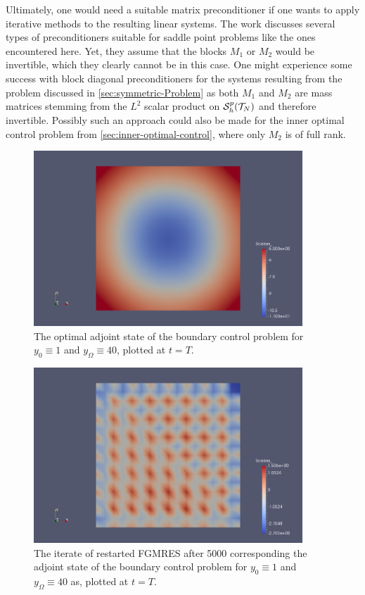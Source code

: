 \documentclass[../thesis.tex]{subfiles}
\begin{document}
Ultimately, one would need a suitable matrix preconditioner if one wants to apply iterative methods to the resulting linear systems. The work \cite{BenziGolubLiesen} discusses several types of preconditioners suitable for saddle point problems like the ones encountered here.
Yet, they assume that the blocks $M_1$ or $M_2$ would be invertible, which they clearly cannot be in this case.
One might experience some success with block diagonal preconditioners for the systems resulting from the problem discussed in \cref{sec:symmetric-Problem} as both $M_1$ and $M_2$ are mass matrices stemming from the $L^2$ scalar product on $\mathcal{S}_h^p(\mathcal{T}_N)$ and therefore invertible.
Possibly such an approach could also be made for the inner optimal control problem from \cref{sec:inner-optimal-control}, where only $M_2$ is of full rank.
\begin{figure}[htpb]
\centering
\includegraphics[width=0.9\textwidth]{Images/boundary-cont-p.png}
\caption{The optimal adjoint state of the boundary control problem for $y_0 \equiv 1$ and $y_\Omega \equiv 40$, plotted at $t = T$.}
\label{fig:boundary-p}
\end{figure}
\begin{figure}[htpb]
\centering
\includegraphics[width=0.9\textwidth]{Images/boundary-cont-GMRES.png}
\caption{The iterate of restarted FGMRES after 5000 corresponding the adjoint state of the boundary control problem for $y_0 \equiv 1$ and $y_\Omega \equiv 40$ as, plotted at $t = T$.}
\label{fig:GMRES-p}
\end{figure}
\FloatBarrier
\end{document}
